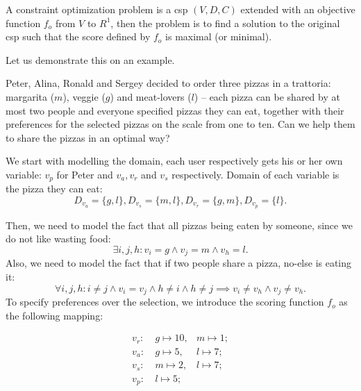 A constraint optimization problem is a \acrshort{csp} $(V,D,C)$ extended with an objective function $f_o$ from $V$ to $R^1$, then the problem is to find a solution to the original \acrshort{csp} such that the score defined by $f_o$ is maximal (or minimal).

Let us demonstrate this on an example. 
\begin{example}\label{example:pizza}
	Peter, Alina, Ronald and Sergey decided to order three pizzas in a trattoria: margarita ($m$), veggie ($g$) and meat-lovers ($l$) -- each pizza can be shared by at most two people and everyone specified pizzas they can eat, together with their preferences for the selected pizzas on the scale from one to ten. Can we help them to share the pizzas in an optimal way?


    We start with modelling the domain, each user respectively gets his or her own variable: $v_p$ for Peter and $v_a,v_r$ and $v_s$ respectively. Domain of each variable is the pizza they can eat:
    \begin{equation}
        D_{v_a} = \{g,l\}, D_{v_s} = \{ m, l \}, D_{v_r} = \{g,m\}, D_{v_p} = \{ l\}.
    \end{equation}

    Then, we need to model the fact that all pizzas being eaten by someone, since we do not like wasting food:
    \begin{equation}
        \exists i,j,h: v_i = g \wedge v_j = m \wedge v_h = l. 
    \end{equation}
    Also, we need to model the fact that if two people share a pizza, no-else is eating it:
    \begin{equation}
        \forall i,j,h: i \neq j \wedge v_i = v_j \wedge h \neq i \wedge h \neq j \implies v_i \neq v_h \wedge v_j \neq v_h.
    \end{equation}
    To specify preferences over the selection, we introduce the scoring function $f_o$ as the following mapping:

        \begin{equation*}
            \begin{aligned}
                v_r:~&g \mapsto 10,  &m \mapsto 1; \\
                v_a:~&g \mapsto 5,   &l \mapsto 7; \\
                v_s:~&m \mapsto 2,   &l \mapsto 7; \\
                v_p:~&l \mapsto 5;   &  \\
            \end{aligned}
        \end{equation*}
\end{example}

